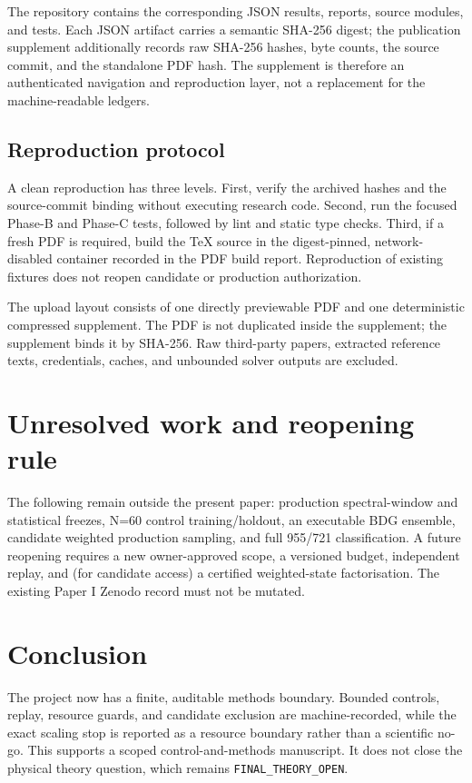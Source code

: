 \documentclass[11pt]{article}
\newcommand{\code}[1]{\texttt{#1}}
\begin{document}
The repository contains the corresponding JSON results, reports, source
modules, and tests.  Each JSON artifact carries a semantic SHA-256 digest; the
publication supplement additionally records raw SHA-256 hashes, byte counts,
the source commit, and the standalone PDF hash.  The supplement is therefore
an authenticated navigation and reproduction layer, not a replacement for the
machine-readable ledgers.

\subsection{Reproduction protocol}

A clean reproduction has three levels.  First, verify the archived hashes and
the source-commit binding without executing research code.  Second, run the
focused Phase-B and Phase-C tests, followed by lint and static type checks.
Third, if a fresh PDF is required, build the TeX source in the digest-pinned,
network-disabled container recorded in the PDF build report.  Reproduction of
existing fixtures does not reopen candidate or production authorization.

The upload layout consists of one directly previewable PDF and one deterministic
compressed supplement.  The PDF is not duplicated inside the supplement; the
supplement binds it by SHA-256.  Raw third-party papers, extracted reference
texts, credentials, caches, and unbounded solver outputs are excluded.

\section{Unresolved work and reopening rule}

The following remain outside the present paper: production spectral-window and
statistical freezes, N=60 control training/holdout, an executable BDG ensemble,
candidate weighted production sampling, and full 955/721 classification.  A
future reopening requires a new owner-approved scope, a versioned budget,
independent replay, and (for candidate access) a certified weighted-state
factorisation.  The existing Paper I Zenodo record must not be mutated.

\clearpage
\section{Conclusion}

The project now has a finite, auditable methods boundary.  Bounded controls,
replay, resource guards, and candidate exclusion are machine-recorded, while
the exact scaling stop is reported as a resource boundary rather than a
scientific no-go.  This supports a scoped control-and-methods manuscript.  It
does not close the physical theory question, which remains
\code{FINAL\_THEORY\_OPEN}.
\end{document}
